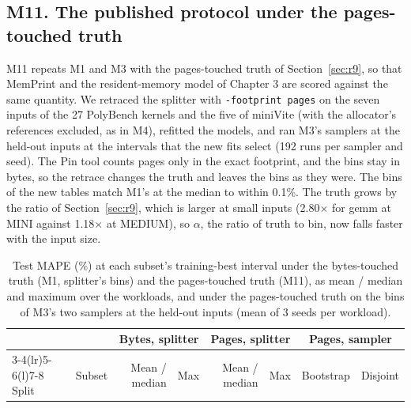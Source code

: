 \documentclass[11pt]{article}
\newcommand{\tabinput}[1]{}
\newcommand{\memprint}{MemPrint}
\begin{document}
\subsection{M11. The published protocol under the pages-touched truth}
\label{sec:m11}

M11 repeats M1 and M3 with the pages-touched truth of Section~\ref{sec:r9}, so that \memprint{} and the
resident-memory model of Chapter 3 are scored against the same quantity. We retraced the splitter with
\texttt{-footprint pages} on the seven inputs of the 27 PolyBench kernels and the five of miniVite (with the
allocator's references excluded, as in M4), refitted the models, and ran M3's samplers at the held-out inputs at the
intervals that the new fits select (192 runs per sampler and seed). The Pin tool counts pages only in the exact
footprint, and the bins stay in bytes, so the retrace changes the truth and leaves the bins as they were. The bins
of the new tables match M1's at the median to within 0.1\%. The truth grows by the ratio of Section~\ref{sec:r9},
which is larger at small inputs (2.80$\times$ for gemm at MINI against 1.18$\times$ at MEDIUM), so $\alpha$, the
ratio of truth to bin, now falls faster with the input size.

\begin{table}[htbp]
\centering
\caption{Test MAPE (\%) at each subset's training-best interval under the bytes-touched truth (M1, splitter's bins)
and the pages-touched truth (M11), as mean / median and maximum over the workloads, and under the pages-touched
truth on the bins of M3's two samplers at the held-out inputs (mean of 3 seeds per workload).}
\label{tab:m11}
\small
\begin{tabular}{@{}llrrrrrr@{}}
\toprule
& & \multicolumn{2}{c}{Bytes, splitter} & \multicolumn{2}{c}{Pages, splitter} & \multicolumn{2}{c}{Pages, sampler} \\
\cmidrule(lr){3-4}\cmidrule(lr){5-6}\cmidrule(l){7-8}
Split & Subset & Mean / median & Max & Mean / median & Max & Bootstrap & Disjoint \\
\midrule
\tabinput{m11}
\bottomrule
\end{tabular}
\end{table}
\end{document}

